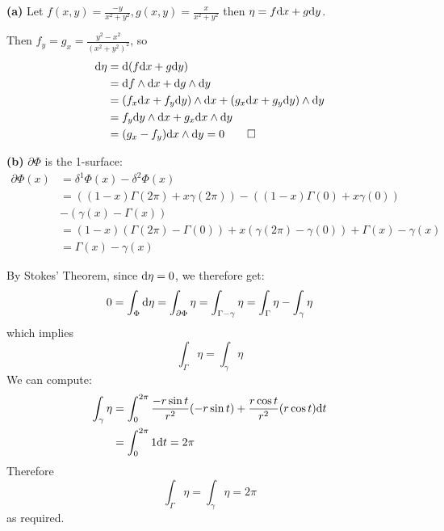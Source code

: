 \documentclass[a4paper, 12pt]{article}
\begin{document}
\begin{solution}
    \textbf{(a)} Let $f(x, y) = \frac{-y}{x^2 + y^2}, g(x, y) = \frac{x}{x^2 + y^2}$ then $\eta = f \mathrm{d} x + g \mathrm{d} y$.

    Then $f_y = g_x = \frac{y^2 - x^2}{(x^2 + y^2)^2}$, so 
    \begin{align*}
        \mathrm{d} \eta &= \mathrm{d} (f \mathrm{d} x + g \mathrm{d} y) \\
        &= \mathrm{d} f \wedge \mathrm{d} x + \mathrm{d} g \wedge \mathrm{d} y \\
        &= \left(f_x \mathrm{d} x + f_y \mathrm{d} y\right) \wedge \mathrm{d} x + \left(g_x \mathrm{d} x + g_y \mathrm{d} y\right) \wedge \mathrm{d} y \\
        &= f_y \mathrm{d} y \wedge \mathrm{d} x + g_x \mathrm{d} x \wedge \mathrm{d} y \\
        &= (g_x - f_y) \mathrm{d} x \wedge \mathrm{d} y = 0 \qed
    \end{align*}

    \textbf{(b)}
    $\partial \Phi$ is the 1-surface:
    \begin{align*}
        \partial \Phi (x) &= \delta^1 \Phi(x) - \delta^2 \Phi (x) \\
        &= ((1-x) \Gamma(2\pi) + x \gamma(2\pi)) - ((1-x) \Gamma(0) + x \gamma(0)) \\
        &- (\gamma(x) - \Gamma(x)) \\
        &= (1-x) (\Gamma(2\pi) - \Gamma(0)) + x(\gamma(2\pi) - \gamma(0)) + \Gamma(x) - \gamma(x) \\
        &= \Gamma(x) - \gamma(x)
    \end{align*}

    By Stokes' Theorem, since $\mathrm{d} \eta = 0$, we therefore get: 
    \begin{equation*}
        0 = \int_{\Phi} \mathrm{d} \eta = \int_{\partial \Phi} \eta = \int_{\Gamma - \gamma} \eta = \int_{\Gamma} \eta - \int_{\gamma} \eta
    \end{equation*}
    which implies \begin{equation*}
        \int_{\Gamma} \eta = \int_{\gamma} \eta
    \end{equation*}
We can compute: \begin{align*}
        \int_{\gamma} \eta &= \int_{0}^{2\pi} \frac{-r \sin t}{r^2} (-r \sin t) + \frac{r \cos t}{r^2} (r \cos t) \mathrm{d} t \\
        &= \int_{0}^{2\pi}1 \mathrm{d} t = 2\pi
    \end{align*}
    Therefore \begin{equation*}
        \int_{\Gamma} \eta = \int_{\gamma} \eta = 2\pi
    \end{equation*}
    as required.
\end{solution}
\end{document}
